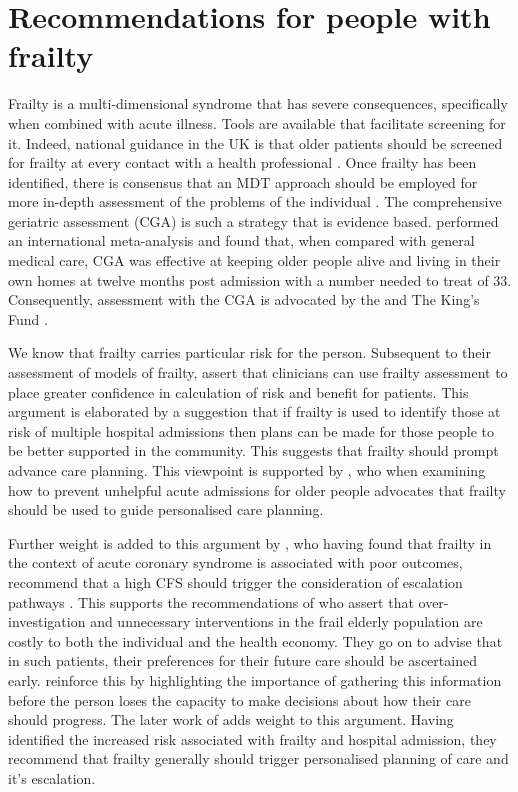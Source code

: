 \documentclass
[
	12pt,
	a4paper,
	oneside,
]{report}
\begin{document}
\section{Recommendations for people with frailty}

Frailty is a multi-dimensional syndrome that has severe consequences,
specifically when combined with acute illness. Tools are available that facilitate
screening for it. Indeed, national guidance in the UK is that older patients 
should be screened for frailty at every contact with a health professional 
\parencite{bgs:14}. Once frailty has been identified, there is consensus that
an MDT approach should be employed for more in-depth assessment of the 
problems of the individual \parencite{vellas:16}. The comprehensive geriatric
assessment (CGA) is such a strategy that is evidence based. \textcite{ellis:11}
performed an international 
meta-analysis and found that, when compared with general medical care,
CGA was effective at keeping older people alive and living in their own homes at
twelve months post admission with a number needed to treat of 33.
Consequently, assessment with the CGA is advocated by the \textcite{bgs:14}
and The King's Fund \parencite{oliver:14}.

We know that frailty carries particular risk for the person. Subsequent to their
assessment of models of frailty, 
\textcite{martin:08} assert that clinicians can use frailty assessment to place 
greater confidence
in calculation of risk and benefit for patients. This argument is elaborated by 
a suggestion that if frailty is used to identify those at risk of multiple 
hospital admissions then plans can be made for those people to be better
supported in the community. This suggests that frailty should prompt advance care
planning. This viewpoint is supported by 
\textcite{hunt:16}, who when examining how to prevent unhelpful acute admissions
for older people advocates that frailty should be used to guide personalised 
care planning.

Further weight is added to this argument by \textcite{kang:15}, who having 
found that frailty in the 
context of acute coronary syndrome is associated
with poor outcomes, \textcite{kang:15} recommend that a high CFS should
trigger the consideration of escalation pathways \parencite{kang:15}.
This supports the recommendations of \textcite{silver:12} who assert that over-investigation
and unnecessary interventions in the frail elderly population are costly to both the
individual and the health economy. They go on to advise that in such patients, 
their preferences for their future care should be ascertained early. \textcite{oliver:14} 
reinforce this by highlighting the importance of gathering this information
before the person loses the capacity to make decisions about how their care should
progress. The later work of \textcite{romero-ortuno:16} adds weight to this argument.
Having identified the increased risk associated with frailty and hospital admission, 
they recommend that frailty generally should trigger personalised planning of
care and it's escalation.
\end{document}
